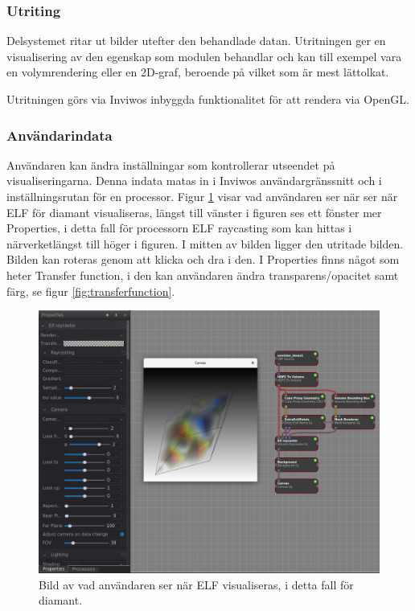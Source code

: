 \documentclass[a4paper,12pt]{article}
\begin{document}
\subsubsection{Utriting}
Delsystemet ritar ut bilder utefter den behandlade datan. Utritningen ger en visualisering av den egenskap som modulen behandlar och kan till exempel vara en volymrendering eller en 2D-graf, beroende på vilket som är mest lättolkat. 

Utritningen görs via Inviwos inbyggda funktionalitet för att rendera via OpenGL. 

\subsubsection{Användarindata}
Användaren kan ändra inställningar som kontrollerar utseendet på visualiseringarna.
Denna indata matas in i Inviwos användargränssnitt och i inställningsrutan för en processor. Figur \ref{fig:interface} visar vad användaren ser när ser när ELF för diamant visualiseras, längst till vänster i figuren ses ett fönster mer Properties, i detta fall för processorn ELF raycasting som kan hittas i närverketlängst till höger i figuren. I mitten av bilden ligger den utritade bilden. Bilden kan roteras genom att klicka och dra i den. I Properties finns något som heter Transfer function, i den kan användaren ändra transparens/opacitet samt färg, se figur \ref{fig:transferfunction}.

\begin{figure}[H]
	\centering
	\includegraphics[scale=0.3]{inviwo_interface_elf.png}
	\caption{Bild av vad användaren ser när ELF visualiseras, i detta fall för diamant.}
	\label{fig:interface}
\end{figure}
\end{document}
